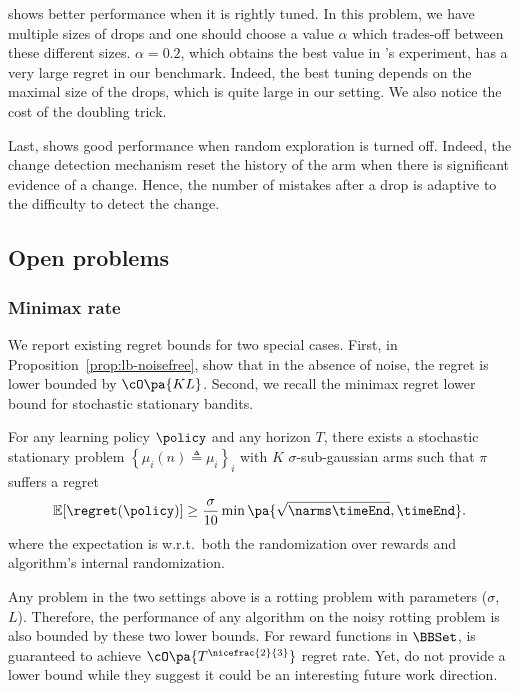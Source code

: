 \SWA shows better performance when it is rightly tuned. In this problem, we have multiple sizes of drops and one should choose a value $\alpha$ which trades-off between these different sizes.  $\alpha=0.2$, which obtains the best value in \citet{levine2017rotting}'s experiment, has a very large regret in our benchmark. Indeed, the best tuning depends on the maximal size of the drops, which is quite large in our setting. We also notice the cost of the doubling trick.

Last, \GLRUCB shows good performance when random exploration is turned off. Indeed, the change detection mechanism reset the history of the arm when there is significant evidence of a change. Hence, the number of mistakes after a drop is adaptive to the difficulty to detect the change. 

\subsection{Open problems}
\label{subsec:rested-open}
\subsubsection{Minimax rate}
We report existing regret bounds for two special cases. First, in Proposition~\ref{prop:lb-noisefree}, \citet{heidari2016tight} show that in the absence of noise, the regret is lower bounded by $\cO\pa{KL}$. Second, we recall the minimax regret lower bound for stochastic stationary bandits.

\begin{proposition}
\label{stochastic-LB}
For any learning policy $\policy$ and any horizon $T$, there exists a stochastic stationary problem $\left\{ \mu_i (n) \triangleq \mu_i\right\}_i$ with $K$ $\sigma$-sub-gaussian arms such that $\pi$ suffers a regret
\begin{equation*}
 \mathbb{E}[\regret(\policy)] \geq \frac{\sigma}{10}\min\pa{\sqrt{\narms\timeEnd},\timeEnd}.
\end{equation*}
where the expectation is w.r.t.\ both the randomization
over rewards and algorithm's internal randomization.
\end{proposition}

Any problem in the two settings above is a rotting problem with parameters ($\sigma$, $L$). Therefore, the performance of any algorithm on the noisy rotting problem is also bounded by these two lower bounds. For reward functions in $\BBSet$, \SWA is guaranteed to achieve $\cO\pa{T^{\nicefrac{2}{3}}}$ regret rate. Yet, \citet{levine2017rotting} do not provide a lower bound while they suggest it could be an interesting future work direction.

